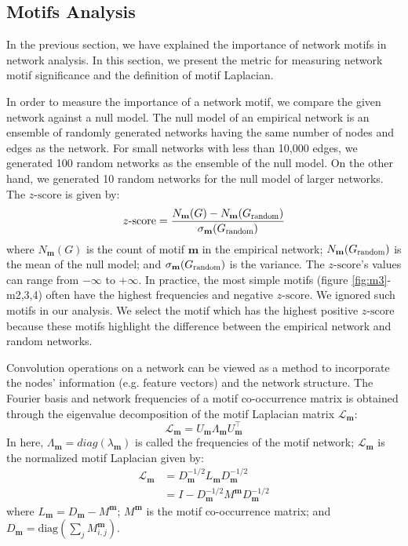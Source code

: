\documentclass{article}
\theoremstyle{definition}
\begin{document}
\subsection{Motifs Analysis}

In the previous section, we have explained the importance of
network motifs in network analysis. In this section, we present
the metric for measuring network motif significance and the definition
of motif Laplacian.

In order to measure the importance of a network motif, we compare
the given network against a null model. The null model of an empirical 
network is an ensemble of randomly generated networks having the same 
number of nodes and edges as the network. For small networks with less 
than 10,000 edges, we generated 100 random networks as the ensemble of the 
null model. On the other hand, we generated 10 random networks for the 
null model of larger networks. The $z\mbox{-score}$ is given by:
\begin{equation*}
z\mbox{-score} = \frac{N_\mathbf{m}(G)-N_\mathbf{m}(G_{\scalebox{0.75}{random}})}{\sigma_\mathbf{m}(G_{\scalebox{0.75}{random}})}
\end{equation*}
where $N_\mathbf{m}(G)$ is the count of motif $\mathbf{m}$ in the 
empirical network; $N_\mathbf{m}(G_{\scalebox{0.75}{random}})$ is the mean 
of the null model; and $\sigma_\mathbf{m}(G_{\scalebox{0.75}{random}})$ is
the variance. The $z\mbox{-score}$'s values can range from 
$-\infty$ to $+\infty$. In practice, the most simple motifs (figure 
\ref{fig:m3}-m2,3,4) often have the highest frequencies and negative $z
\mbox{-score}$. We ignored such motifs in our analysis. We select the motif 
which has the highest positive $z\mbox{-score}$ because these motifs
highlight the difference between the empirical network and random 
networks. 

Convolution operations on a network can be viewed as a method to
incorporate the nodes' information (e.g. feature vectors) 
and the network structure. The Fourier basis and network frequencies of
a motif co-occurrence matrix is obtained through the eigenvalue
decomposition of the motif Laplacian matrix $\mathcal{L}_{\mathbf{m}}$:
\begin{equation} \label{eq:eigm}
\mathcal{L}_{\mathbf{m}} = U_{\mathbf{m}} \Lambda_{\mathbf{m}} 
U^{\top}_{\mathbf{m}}
\end{equation}
In here, $\Lambda_{\mathbf{m}} = diag(\lambda_{\mathbf{m}})$ is called the 
frequencies of the motif network; $\mathcal{L}_{\mathbf{m}}$ is the 
normalized motif Laplacian given by:
\begin{equation} 
\begin{aligned}
\mathcal{L}_{\mathbf{m}} &= D_{\mathbf{m}}^{-1/2} L_{\mathbf{m}} 
D_{\mathbf{m}}^{-1/2} \\
&= I - D_{\mathbf{m}}^{-1/2} M^{\mathbf{m}} D_{\mathbf{m}}^{-1/2}
\end{aligned}
\label{eq:eigm}
\end{equation}
where $L_{\mathbf{m}} = D_{\mathbf{m}} - M^{\mathbf{m}}$; $M^{\mathbf{m}}$
is the motif co-occurrence matrix; and $D_{\mathbf{m}} = \mbox{diag} 
( \sum_j M^{\mathbf{m}}_{i,j} )$.
\end{document}
